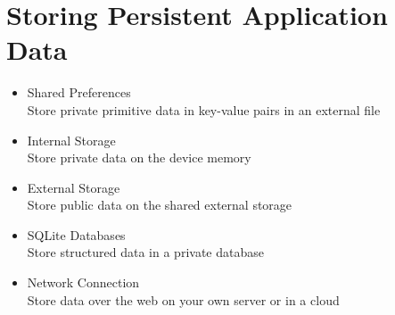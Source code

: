\section{Storing Persistent Application Data}

\begin{breakbox}
\begin{itemize}
\tightlist
\item
  Shared Preferences\\
  Store private primitive data in key-value pairs in an external file
\item
  Internal Storage\\
  Store private data on the device memory
\item
  External Storage\\
  Store public data on the shared external storage
\item
  SQLite Databases\\
  Store structured data in a private database
\item
  Network Connection\\
  Store data over the web on your own server or in a cloud
\end{itemize}
\end{breakbox}

